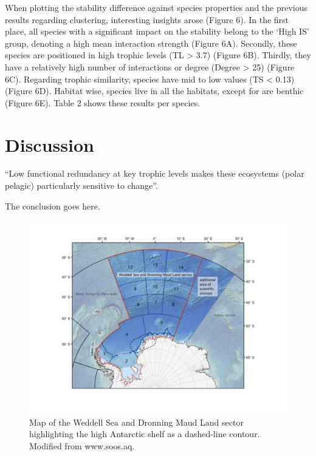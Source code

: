 \documentclass[gc, manuscript]{copernicus}
\begin{document}
When plotting the stability difference against species properties and
the previous results regarding clustering, interesting insights arose
(Figure 6). In the first place, all species with a significant impact on
the stability belong to the `High IS' group, denoting a high mean
interaction strength (Figure 6A). Secondly, these species are positioned
in high trophic levels (TL \textgreater{} 3.7) (Figure 6B). Thirdly,
they have a relatively high number of interactions or degree (Degree
\textgreater{} 25) (Figure 6C). Regarding trophic similarity, species
have mid to low values (TS \textless{} 0.13) (Figure 6D). Habitat wise,
species live in all the habitats, except for are benthic (Figure 6E).
Table 2 shows these results per species.

\section{Discussion}

``Low functional redundancy at key trophic levels makes these ecosystems
(polar pelagic) particularly sensitive to change''. \citep{Murphy2016}

\clearpage
\conclusions[Conclusions]

The conclusion goes here.

\clearpage

\begin{figure}
\includegraphics[width=12cm]{Fig.1_StudyMap} \caption{Map of the Weddell Sea and Dronning Maud Land sector highlighting the high Antarctic shelf as a dashed-line contour. Modified from www.soos.aq.}\label{fig:unnamed-chunk-1}
\end{figure}
\end{document}
